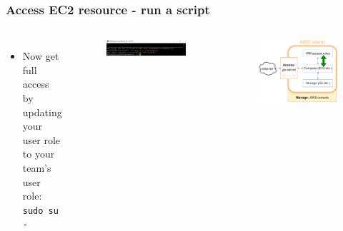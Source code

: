 \documentclass[aspectratio=169]{beamer} %
\begin{document}
\begin{frame}
	\frametitle{Access EC2 resource - run a script}
	\begin{columns}[c]
		\begin{itemize}
			\item Now get full access by updating your user role to your team's user role: \newline \texttt{sudo su - \srvAcctName}
		\end{itemize}
		
		\begin{figure}
			\centering
			\includegraphics[width=\textwidth]{./img/access-4.png}
		\end{figure}
		
		\begin{figure}
			\centering
			\includegraphics[width=\textwidth]{./img/wb-aws-iam.png}
		\end{figure}
		
	\end{columns}
\end{frame}
\end{document}

